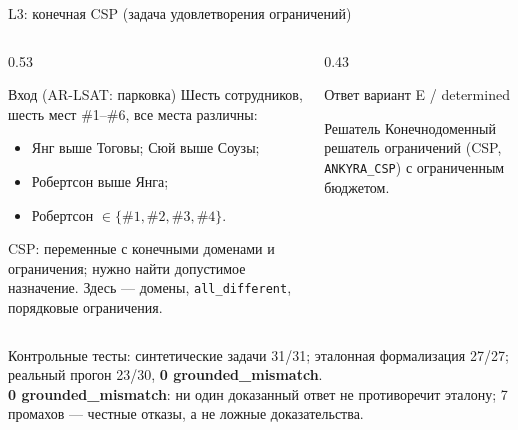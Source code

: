 \documentclass[aspectratio=169,11pt]{beamer}
\newcommand{\Prov}[1]{\textcolor{provencolor}{#1}}
\begin{document}
\begin{frame}[shrink=3]{L3: конечная CSP (задача удовлетворения ограничений)}
  \footnotesize
  \begin{columns}[T,onlytextwidth]
    \begin{column}{0.53\textwidth}
      \begin{block}{Вход (AR-LSAT: парковка)}
        Шесть сотрудников, шесть мест \#1--\#6, все места различны:
        \begin{itemize}
          \item Янг выше Тоговы; Сюй выше Соузы;
          \item Робертсон выше Янга;
          \item Робертсон \(\in\{\#1,\#2,\#3,\#4\}\).
        \end{itemize}
        CSP: переменные с конечными доменами и ограничения; нужно найти
        допустимое назначение. Здесь --- домены, \texttt{all\_different},
        порядковые ограничения.
      \end{block}
    \end{column}
    \begin{column}{0.43\textwidth}
      \begin{block}{Ответ}
        \Prov{вариант E / determined}
      \end{block}
      \begin{block}{Решатель}
        Конечнодоменный решатель ограничений (CSP,
        \texttt{ANKYRA\_CSP}) с ограниченным бюджетом.
      \end{block}
    \end{column}
  \end{columns}

  \vspace{1mm}
  {\scriptsize Контрольные тесты: синтетические задачи 31/31;
  эталонная формализация 27/27; реальный прогон 23/30,
  \textbf{0 grounded\_mismatch}.\\
  \textbf{0 grounded\_mismatch}: ни один доказанный ответ не противоречит
  эталону; 7 промахов --- честные отказы, а не ложные доказательства.}
\end{frame}
\end{document}
